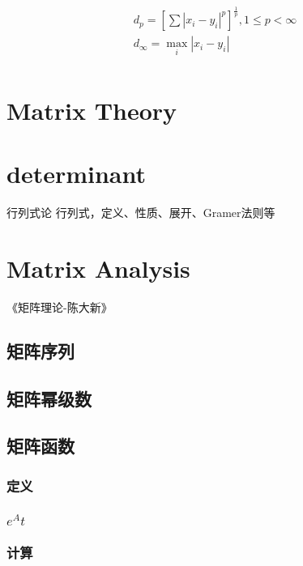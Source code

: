 \documentclass[UTF8]{../../09-Mathematics}
\begin{document}
\begin{equation}
    \begin{split}
    &d_p = [\sum |x_i-y_i|^p]^{\frac{1}{p}}, 1\leqslant p < \infty\\
    & d_{\infty} = \max_i|x_i-y_i|\\
\end{split}
\end{equation}


\chapter{Matrix Theory} %



\chapter{determinant}

行列式论
行列式，定义、性质、展开、Gramer法则等








\chapter{Matrix Analysis}
《矩阵理论-陈大新》

\section{矩阵序列}
\section{矩阵幂级数}


\section{矩阵函数}

\subsection{定义}
\subsection{$e^At$}
\subsection{计算}
\end{document}
